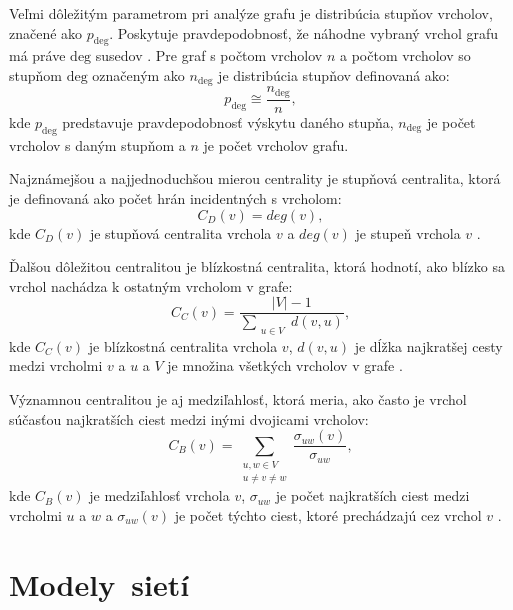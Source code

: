 Veľmi dôležitým parametrom pri analýze grafu je distribúcia stupňov vrcholov, značené ako $p_{\mathrm{deg}}$.
Poskytuje pravdepodobnosť, že náhodne vybraný vrchol grafu má práve $\mathrm{deg}$ susedov \cite{barabasi2016network} .
Pre graf s počtom vrcholov $n$ a počtom vrcholov so stupňom $\mathrm{deg}$ označeným ako $n_{\mathrm{deg}}$ je distribúcia stupňov definovaná ako:
\begin{equation}
    p_{\mathrm{deg}} \cong \frac{n_{\mathrm{deg}}}{n},
    \label{eq:degree_distribution}
\end{equation}
kde $p_{\mathrm{deg}}$ predstavuje pravdepodobnosť výskytu daného stupňa, $n_{\mathrm{deg}}$ je počet vrcholov s daným stupňom a $n$ je počet vrcholov grafu.

Najznámejšou a najjednoduchšou mierou centrality je stupňová centralita, ktorá je definovaná ako počet hrán incidentných s vrcholom:
\begin{equation}
    C_D(v) = deg(v),
    \label{eq:degree_centrality}
\end{equation}
kde $C_D(v)$ je stupňová centralita vrchola $v$ a $deg(v)$ je stupeň vrchola $v$ \cite{borgatti2006graph}.

Ďalšou dôležitou centralitou je blízkostná centralita, ktorá hodnotí, ako blízko sa vrchol nachádza k ostatným vrcholom v grafe:
\begin{equation}
    C_C(v) = \frac{|V|-1}{\sum_{\substack{u \in V}} d(v, u)},
    \label{eq:closeness_centrality}
\end{equation}
kde $C_C(v)$ je blízkostná centralita vrchola $v$, $d(v, u)$ je dĺžka najkratšej cesty medzi vrcholmi $v$ a $u$ a $V$
je množina všetkých vrcholov v grafe \cite{borgatti2006graph}.

Významnou centralitou je aj medziľahlosť, ktorá meria, ako často je vrchol súčasťou najkratších ciest medzi inými dvojicami vrcholov:
\begin{equation}
    C_B(v) = \sum_{\substack{u, w \in V \\ u \ne v \ne w}} \frac{\sigma_{uw}(v)}{\sigma_{uw}},
    \label{eq:betweenness_centrality}
\end{equation}
kde $C_B(v)$ je medziľahlosť vrchola $v$, $\sigma_{uw}$ je počet najkratších ciest medzi vrcholmi $u$ a $w$ a $\sigma_{uw}(v)$ je počet týchto ciest,
ktoré prechádzajú cez vrchol $v$ \cite{borgatti2006graph}.


\section{Modely~sietí}\label{sec:network-models}

